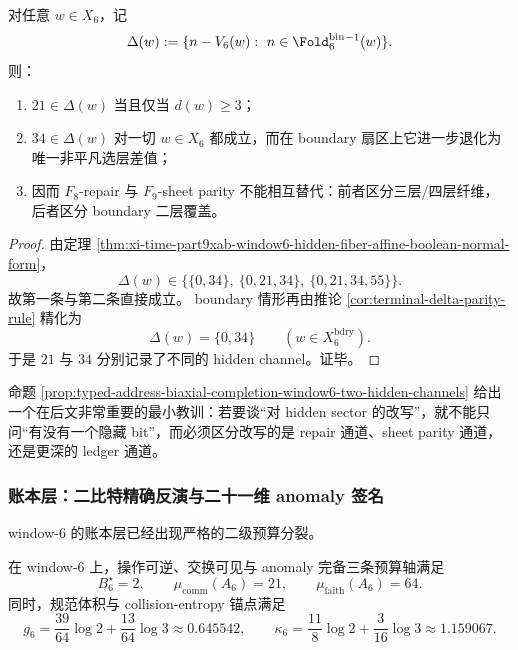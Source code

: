 \begin{proposition}\label{prop:typed-address-biaxial-completion-window6-two-hidden-channels}
对任意 \(w\in X_6\)，记
\[
\Delta(w):=\{n-V_6(w):\ n\in \Fold_6^{\mathrm{bin}}{}^{-1}(w)\}.
\]
则：
\begin{enumerate}
  \item \(21\in \Delta(w)\) 当且仅当 \(d(w)\ge 3\)；
  \item \(34\in \Delta(w)\) 对一切 \(w\in X_6\) 都成立，而在 boundary 扇区上它进一步退化为唯一非平凡选层差值；
  \item 因而 \(F_8\)-repair 与 \(F_9\)-sheet parity 不能相互替代：前者区分三层/四层纤维，后者区分 boundary 二层覆盖。
\end{enumerate}
\end{proposition}

\begin{proof}
由定理 \ref{thm:xi-time-part9xab-window6-hidden-fiber-affine-boolean-normal-form}，
\[
\Delta(w)\in\bigl\{\{0,34\},\ \{0,21,34\},\ \{0,21,34,55\}\bigr\}.
\]
故第一条与第二条直接成立。
boundary 情形再由推论 \ref{cor:terminal-delta-parity-rule} 精化为
\[
\Delta(w)=\{0,34\}
\qquad (w\in X_6^{\mathrm{bdry}}).
\]
于是 \(21\) 与 \(34\) 分别记录了不同的 hidden channel。证毕。
\end{proof}

命题 \ref{prop:typed-address-biaxial-completion-window6-two-hidden-channels} 给出一个在后文非常重要的最小教训：若要谈“对 hidden sector 的改写”，就不能只问“有没有一个隐藏 bit”，而必须区分改写的是 repair 通道、sheet parity 通道，还是更深的 ledger 通道。

\subsubsection{账本层：二比特精确反演与二十一维 anomaly 签名}\label{subsubsec:typed-address-biaxial-completion-window6-ledger-budget}
window-\(6\) 的账本层已经出现严格的二级预算分裂。

\begin{proposition}\label{prop:typed-address-biaxial-completion-window6-ledger-budget}
在 window-\(6\) 上，操作可逆、交换可见与 anomaly 完备三条预算轴满足
\[
B_6^\star=2,
\qquad
\mu_{\mathrm{comm}}(A_6)=21,
\qquad
\mu_{\mathrm{faith}}(A_6)=64.
\]
同时，规范体积与 collision-entropy 锚点满足
\[
g_6=\frac{39}{64}\log 2+\frac{13}{64}\log 3\approx 0.645542,
\qquad
\kappa_6=\frac{11}{8}\log 2+\frac{3}{16}\log 3\approx 1.159067.
\]
\end{proposition}

